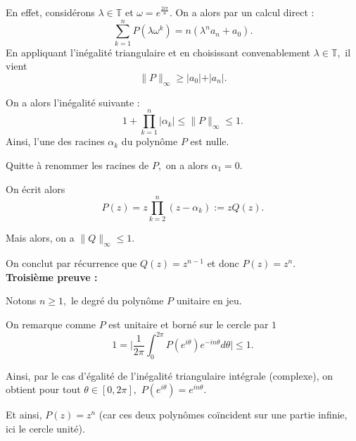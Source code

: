 En effet, considérons $\lambda\in\mathbb{T}$ et $\omega=e^{\frac{2i\pi}{n}}.$
On a alors par un calcul direct :  $$\sum_{k=1}^{n}P(\lambda\omega^{k})=n(\lambda^{n}a_{n}+a_{0}).$$
En appliquant l'inégalité triangulaire et en choisissant convenablement $\lambda\in\mathbb{T},$ il vient $$\|P\|_{\infty}\geq \vert a_{0} \vert + \vert a_{n}\vert.$$

On a alors l'inégalité suivante : $$ 1+\prod_{k=1}^{n}\vert \alpha_{k} \vert \leq \|P\|_{\infty} \leq 1.$$
Ainsi, l'une des racines $\alpha_{k}$ du polynôme $P$ est nulle.

Quitte à renommer les racines de $P,$ on a alors $\alpha_{1}=0.$ 

On écrit alors $$P(z)=z\prod_{k=2}^{n}(z-\alpha_{k}):=zQ(z).$$

Mais alors, on a $\displaystyle \|Q\|_{\infty}\leq 1.$

On conclut par récurrence que $Q(z)=z^{n-1}$ et donc $P(z)=z^{n}.$\\

\textbf{Troisième preuve :} 

Notons $n\geq 1,$ le degré du polynôme $P$ unitaire en jeu.

On remarque comme $P$ est unitaire et borné sur le cercle par $1$ $$1=\big\vert \frac{1}{2\pi}\int_{0}^{2\pi}P(e^{i\theta})e^{-in\theta}d\theta \big\vert \leq 1.$$

Ainsi, par le cas d'égalité de l'inégalité triangulaire intégrale (complexe), on obtient pour tout $\theta\in [0,2\pi],$ $\displaystyle P(e^{i\theta})=e^{in\theta}.$

Et ainsi, $P(z)=z^{n}$ (car ces deux polynômes coïncident sur une partie infinie, ici le cercle unité).
